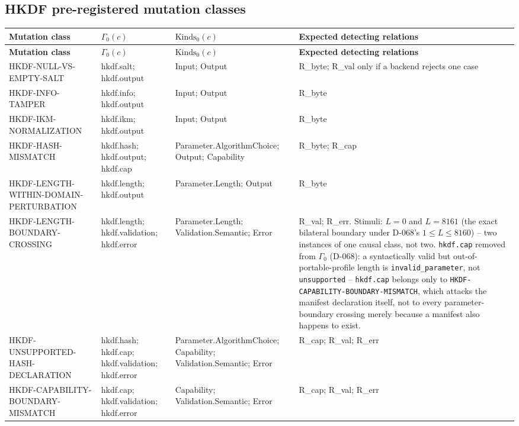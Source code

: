 \documentclass[11pt,a4paper]{article}
\begin{document}
\subsection{HKDF pre-registered mutation classes}
\begin{longtable}{@{}L{0.22\textwidth}L{0.24\textwidth}L{0.24\textwidth}L{0.22\textwidth}@{}}
\toprule
\textbf{Mutation class} & \textbf{$\Gamma_0(c)$} & \textbf{$\text{Kinds}_0(c)$} & \textbf{Expected detecting relations}\\
\midrule\endfirsthead
\toprule
\textbf{Mutation class} & \textbf{$\Gamma_0(c)$} & \textbf{$\text{Kinds}_0(c)$} & \textbf{Expected detecting relations}\\
\midrule\endhead
HKDF-NULL-VS-EMPTY-SALT & hkdf.salt; hkdf.output & Input; Output & R\_byte; R\_val only if a backend rejects one case\\
HKDF-INFO-TAMPER & hkdf.info; hkdf.output & Input; Output & R\_byte\\
HKDF-IKM-NORMALIZATION & hkdf.ikm; hkdf.output & Input; Output & R\_byte\\
HKDF-HASH-MISMATCH & hkdf.hash; hkdf.output; hkdf.cap & Parameter.\allowbreak AlgorithmChoice; Output; Capability & R\_byte; R\_cap\\
HKDF-LENGTH-WITHIN-DOMAIN-PERTURBATION & hkdf.length; hkdf.output & Parameter.Length; Output & R\_byte\\
HKDF-LENGTH-BOUNDARY-CROSSING & hkdf.length; hkdf.validation; hkdf.error & Parameter.Length; Validation.Semantic; Error & R\_val; R\_err. Stimuli: $L=0$ and $L=8161$ (the exact bilateral boundary under D-068's $1\le L\le 8160$) -- two instances of one causal class, not two. \texttt{hkdf.cap} removed from $\Gamma_0$ (D-068): a syntactically valid but out-of-portable-profile length is \texttt{invalid\_parameter}, not \texttt{unsupported} -- \texttt{hkdf.cap} belongs only to \texttt{HKDF-CAPABILITY-BOUNDARY-MISMATCH}, which attacks the manifest declaration itself, not to every parameter-boundary crossing merely because a manifest also happens to exist.\\
HKDF-UNSUPPORTED-HASH-DECLARATION & hkdf.hash; hkdf.cap; hkdf.validation; hkdf.error & Parameter.\allowbreak AlgorithmChoice; Capability; Validation.Semantic; Error & R\_cap; R\_val; R\_err\\
HKDF-CAPABILITY-BOUNDARY-MISMATCH & hkdf.cap; hkdf.validation; hkdf.error & Capability; Validation.Semantic; Error & R\_cap; R\_val; R\_err\\
\bottomrule
\end{longtable}
\end{document}
